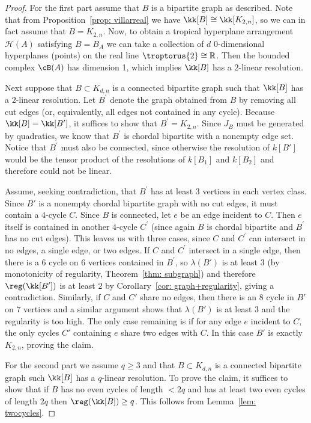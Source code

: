 \begin{proof}
For the first part assume that $B$ is a bipartite graph as described. Note that from Proposition~\ref{prop: villarreal} we have $\kk[B] \cong \kk[K_{2,n}]$, so we can in fact assume that $B = K_{2,n}$. Now, to obtain a tropical hyperplane arrangement ${\mathcal H}(A)$ satisfying $B = B_A$ we can take a collection of $d$ $0$-dimensional hyperplanes (points) on the real line $\troptorus{2} \cong {\mathbb R}$.  Then the bounded complex $\cB(A)$ has dimension 1, which implies $\kk[B]$ has a $2$-linear resolution.


Next suppose that $B \subset K_{d,n}$ is a connected bipartite graph such that $\kk[B]$ has a $2$-linear resolution.  
Let $B^\prime$ denote the graph obtained from $B$ by removing all cut edges (or, equivalently, all edges not contained in any cycle). Because $\kk[B] = \kk[B']$, it suffices to show that $B^\prime = K_{2,n}$. 
Since $J_B$ must be generated by quadratics, we know that $B^\prime$ is chordal bipartite with a nonempty edge set. Notice that $B^\prime$ must also be connected, since otherwise the resolution of $k[B']$ would be the tensor product of the resolutions of $k[B_1]$ and $k[B_2]$ and therefore could not be linear.

Assume, seeking contradiction, that $B^\prime$ has at least 3 vertices in each vertex class. Since $B'$ is a nonempty chordal bipartite graph with no cut edges, it must contain a $4$-cycle $C$. Since $B$ is connected, let $e$ be an edge incident to $C$.  Then $e$ itself is contained in another $4$-cycle $C^\prime$ (since again $B$ is chordal bipartite and $B^\prime$ has no cut edges).  This leaves us with three cases, since $C$ and $C^\prime$ can intersect in no edges, a single edge, or two edges. If $C$ and $C^\prime$ intersect in a single edge, then there is a $6$ cycle on $6$ vertices contained in $B^\prime$, so $\lambda(B')$ is at least $3$ (by monotonicity of regularity, Theorem~\ref{thm: subgraph}) and therefore $\reg(\kk[B^\prime])$ is at least $2$ by Corollary~\ref{cor: graph+regularity}, giving a contradiction. Similarly, if $C$ and $C'$ share no edges, then there is an $8$ cycle in $B'$ on $7$ vertices and a similar argument shows that $\lambda(B')$ is at least $3$ and the regularity is too high. 
The only case remaining is if for any edge $e$ incident to $C$, the only cycles $C'$ containing $e$ share two edges with $C$. In this case $B'$ is exactly $K_{2,n}$, proving the claim.

For the second part we assume $q \geq 3$ and that $B \subset K_{d,n}$ is a connected bipartite graph such $\kk[B]$ has a $q$-linear resolution.  To prove the claim, it suffices to show that if $B$ has no even cycles of length $< 2q$ and has at least two even cycles of length $2q$ then $\reg(\kk[B]) \geq q$.  This follows from Lemma~\ref{lem: twocycles}.
\end{proof}

